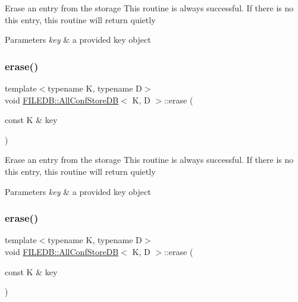 Erase an entry from the storage This routine is always successful. If there is no this entry, this routine will return quietly 
\begin{DoxyParams}{Parameters}
{\em key} & a provided key object \\
\hline
\end{DoxyParams}
\mbox{\label{classFILEDB_1_1AllConfStoreDB_afb092d33f9ca14ca30918d6cb8251fdb}} 
\subsubsection{\texorpdfstring{erase()}{erase()}\hspace{0.1cm}{\footnotesize\ttfamily [2/3]}}
{\footnotesize\ttfamily template$<$typename K, typename D$>$ \\
void \mbox{\hyperlink{classFILEDB_1_1AllConfStoreDB}{F\+I\+L\+E\+D\+B\+::\+All\+Conf\+Store\+DB}}$<$ K, D $>$\+::erase (\begin{DoxyParamCaption}\item[{const K \&}]{key }\end{DoxyParamCaption})\hspace{0.3cm}{\ttfamily [inline]}}

Erase an entry from the storage This routine is always successful. If there is no this entry, this routine will return quietly 
\begin{DoxyParams}{Parameters}
{\em key} & a provided key object \\
\hline
\end{DoxyParams}
\mbox{\label{classFILEDB_1_1AllConfStoreDB_afb092d33f9ca14ca30918d6cb8251fdb}} 
\subsubsection{\texorpdfstring{erase()}{erase()}\hspace{0.1cm}{\footnotesize\ttfamily [3/3]}}
{\footnotesize\ttfamily template$<$typename K, typename D$>$ \\
void \mbox{\hyperlink{classFILEDB_1_1AllConfStoreDB}{F\+I\+L\+E\+D\+B\+::\+All\+Conf\+Store\+DB}}$<$ K, D $>$\+::erase (\begin{DoxyParamCaption}\item[{const K \&}]{key }\end{DoxyParamCaption})\hspace{0.3cm}{\ttfamily [inline]}}

